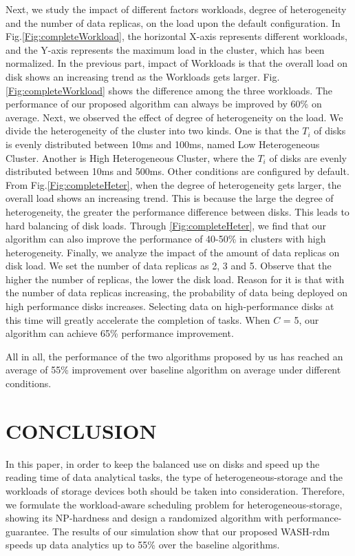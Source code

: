\documentclass[conference]{IEEEtran}
\begin{document}
Next, we study the impact of different factors workloads, degree of heterogeneity and the number of data replicas, on the load upon the default configuration. In Fig.\ref{Fig:completeWorkload}, the horizontal X-axis represents different workloads, and the Y-axis represents the maximum load in the cluster, which has been normalized. In the previous part, impact of Workloads is that the overall load on disk shows an increasing trend as the Workloads gets larger. Fig.\ref{Fig:completeWorkload} shows the difference among the three workloads. The performance of our proposed algorithm can always be improved by 60\% on average. Next, we observed the effect of degree of heterogeneity on the load. We divide the heterogeneity of the cluster into two kinds. One is that the $T_i$ of disks is evenly distributed between 10ms and 100ms, named Low Heterogeneous Cluster. Another is High Heterogeneous Cluster, where the $T_i$ of disks are evenly distributed between 10ms and 500ms. Other conditions are configured by default. From Fig.\ref{Fig:completeHeter}, when the degree of heterogeneity gets larger, the overall load shows an increasing trend. This is because the large the degree of heterogeneity, the greater the performance difference between disks. This leads to hard balancing of disk loads. Through \ref{Fig:completeHeter}, we find that our algorithm can also improve the performance of 40-50\% in clusters with high heterogeneity. Finally, we analyze the impact of the amount of data replicas on disk load. We set the number of data replicas as 2, 3 and 5. Observe that the higher the number of replicas, the lower the disk load. Reason for it is that with the number of data replicas increasing, the probability of data being deployed on high performance disks increases. Selecting data on high-performance disks at this time will greatly accelerate the completion of tasks. When $C$ = 5, our algorithm can achieve 65\% performance improvement.
 
 All in all,  the performance of the two algorithms proposed by us has reached an average of 55\% improvement over baseline algorithm on average under different conditions.



\section{CONCLUSION}\label{CONCLUSION}
In this paper, in order to keep the balanced use on disks and speed up the reading time of data analytical tasks, the type of heterogeneous-storage and the workloads of storage devices both should be taken into consideration. Therefore, we formulate the workload-aware scheduling problem for heterogeneous-storage, showing its NP-hardness and design a randomized algorithm with performance-guarantee. The results of our simulation show that our proposed WASH-rdm speeds up data analytics up to 55\% over the baseline algorithms.
\end{document}
